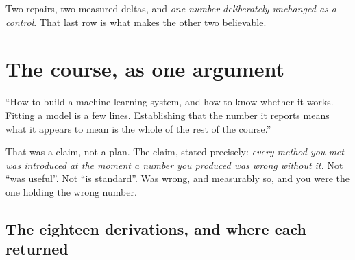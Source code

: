 \documentclass[11pt,a4paper]{article}
\begin{document}
Two repairs, two measured deltas, and \emph{one number deliberately unchanged
as a control}. That last row is what makes the other two believable.

\section{The course, as one argument}

\begin{keybox}[title={What the first lecture promised}]
``How to build a machine learning system, and how to know whether it works.
Fitting a model is a few lines. Establishing that the number it reports means
what it appears to mean is the whole of the rest of the course.''

That was a claim, not a plan. The claim, stated precisely: \emph{every method
you met was introduced at the moment a number you produced was wrong without
it.} Not ``was useful''. Not ``is standard''. Was wrong, and measurably so, and
you were the one holding the wrong number.
\end{keybox}

\subsection{The eighteen derivations, and where each returned}
\end{document}
